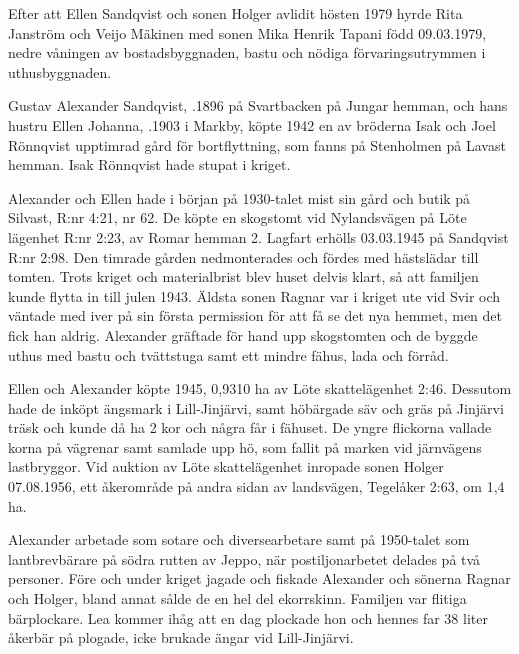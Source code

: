 %
Efter att Ellen Sandqvist och sonen Holger avlidit hösten 1979 hyrde Rita Janström och Veijo Mäkinen med sonen Mika Henrik Tapani född 09.03.1979, nedre våningen av bostadsbyggnaden, bastu och nödiga förvaringsutrymmen i uthusbyggnaden.


%
Gustav Alexander Sandqvist, .1896 på Svartbacken på Jungar hemman, och hans hustru Ellen Johanna, .1903 i Markby, köpte 1942 en av bröderna Isak och Joel Rönnqvist upptimrad gård för bortflyttning, som fanns på Stenholmen på Lavast hemman. Isak Rönnqvist hade stupat i kriget.

Alexander och Ellen hade i början på 1930-talet mist sin gård och butik på Silvast, R:nr 4:21, nr 62.  De köpte en skogstomt vid Nylandsvägen på Löte lägenhet R:nr 2:23, av Romar hemman 2. Lagfart erhölls 03.03.1945 på Sandqvist R:nr 2:98. Den timrade gården nedmonterades och fördes med hästslädar till tomten. Trots kriget och materialbrist blev huset delvis klart, så att familjen kunde flytta in till julen 1943. Äldsta sonen Ragnar var i kriget ute vid Svir och väntade med iver på sin första permission för att få se det nya hemmet, men det fick han aldrig. Alexander gräftade för hand upp skogstomten och de byggde uthus med bastu och tvättstuga samt ett mindre fähus, lada och förråd.


Ellen och Alexander köpte 1945, 0,9310 ha av Löte skattelägenhet 2:46. Dessutom hade de inköpt ängsmark i Lill-Jinjärvi, samt höbärgade säv och gräs på Jinjärvi träsk och kunde då ha 2 kor och några får i fähuset. De yngre flickorna vallade korna på vägrenar samt samlade upp hö, som fallit på marken vid järnvägens lastbryggor. Vid auktion av Löte skattelägenhet inropade sonen Holger 07.08.1956, ett åkerområde på andra sidan av landsvägen, Tegelåker 2:63, om 1,4 ha.

Alexander arbetade som sotare och diversearbetare samt på 1950-talet som lantbrevbärare på södra rutten av Jeppo, när postiljonarbetet delades på två personer. Före och under kriget jagade och fiskade Alexander och sönerna Ragnar och Holger, bland annat sålde de en hel del ekorrskinn. Familjen var flitiga bärplockare. Lea kommer ihåg att en dag plockade hon och hennes far 38 liter åkerbär på plogade, icke brukade ängar vid Lill-Jinjärvi.

